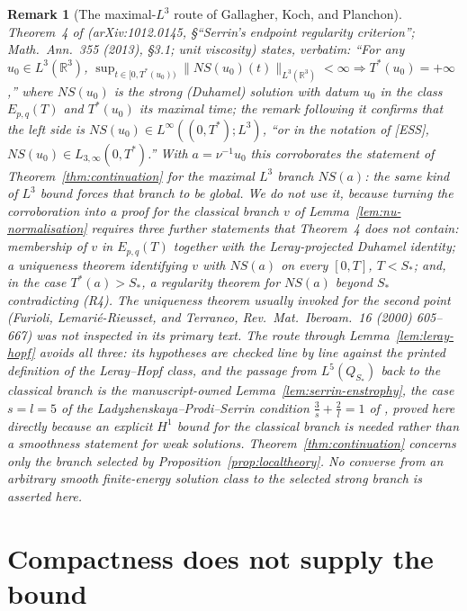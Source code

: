 \documentclass[11pt]{article}
\newtheorem{remark}[theorem]{Remark}
\theoremstyle{definition}
\theoremstyle{plain}
\newcommand{\R}{\mathbb R}
\newcommand{\norm}[1]{\lVert #1\rVert}
\begin{document}
\begin{remark}[The maximal-$L^3$ route of Gallagher, Koch, and Planchon]
\label{rem:gkp}
Theorem~4 of \cite{GKP2013} (arXiv:1012.0145, \S``Serrin's endpoint
regularity criterion''; \emph{Math.\ Ann.}\ 355 (2013), \S3.1; unit viscosity)
states, verbatim: ``For any $u_0\in L^3(\R^3)$,
$\sup_{t\in[0,T^*(u_0))}\norm{NS(u_0)(t)}_{L^3(\R^3)}<\infty\Longrightarrow T^*(u_0)=+\infty$,''
where $NS(u_0)$ is the strong (Duhamel) solution with datum $u_0$ in the
class $E_{p,q}(T)$ and $T^*(u_0)$ its maximal time; the remark following it
confirms that the left side is $NS(u_0)\in L^\infty((0,T^*);L^3)$,
``or in the notation of [ESS], $NS(u_0)\in L_{3,\infty}(0,T^*)$.''  With
$a=\nu^{-1}u_0$ this corroborates the \emph{statement} of
Theorem~\ref{thm:continuation} for the maximal $L^3$ branch $NS(a)$: the
same kind of $L^3$ bound forces that branch to be global.  We do not use it,
because turning the corroboration into a proof for the classical branch $v$
of Lemma~\ref{lem:nu-normalisation} requires three further statements that
Theorem~4 does not contain: membership of $v$ in $E_{p,q}(T)$ together with
the Leray-projected Duhamel identity; a uniqueness theorem identifying $v$
with $NS(a)$ on every $[0,T]$, $T<S_*$; and, in the case $T^*(a)>S_*$, a
regularity theorem for $NS(a)$ beyond $S_*$ contradicting (R4).  The
uniqueness theorem usually invoked for the second point (Furioli,
Lemari\'e-Rieusset, and Terraneo, \emph{Rev.\ Mat.\ Iberoam.}\ 16 (2000)
605--667) was not inspected in its primary text.  The route through
Lemma~\ref{lem:leray-hopf} avoids all three: its hypotheses are checked line
by line against the printed definition of the Leray--Hopf class, and the
passage from $L^5(Q_{S_*})$ back to the classical branch is the
manuscript-owned Lemma~\ref{lem:serrin-enstrophy}, the case $s=l=5$ of the
Ladyzhenskaya--Prodi--Serrin condition $\frac3s+\frac2l=1$ of
\cite[Theorem~1.2, p.~213]{ESS2003}, proved here directly because an explicit
$H^1$ bound for the classical branch is needed rather than a smoothness
statement for weak solutions.  Theorem~\ref{thm:continuation} concerns only
the branch selected by Proposition~\ref{prop:localtheory}.  No converse from
an arbitrary smooth finite-energy solution class to the selected strong
branch is asserted here.
\end{remark}

\section{Compactness does not supply the bound}\label{sec:compactness}
\end{document}
